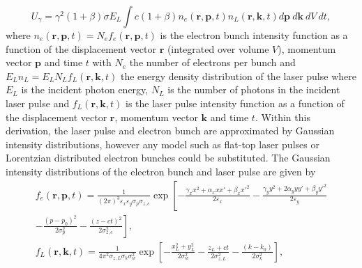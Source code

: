\documentclass[../main.tex]{subfiles}
\begin{document}
\begin{equation}
U_{\gamma} = \gamma^{2}\left(1+\beta\right)\sigma E_{L}\int c\left(1+\beta\right) n_{e}\left(\mathbf{r},\mathbf{p},t\right)n_{L}\left(\mathbf{r},\mathbf{k},t\right) d\mathbf{p}~d\mathbf{k}~dV~dt,
\label{eq:total_interaction_energy}
\end{equation}
where $n_{e}\left(\mathbf{r},\mathbf{p},t\right) = N_{e}f_{e}\left(\mathbf{r},\mathbf{p},t\right)$ is the  electron bunch intensity function as a function of the displacement vector $\mathbf{r}$ (integrated over volume $V$), momentum vector $\mathbf{p}$ and time $t$ with $N_{e}$ the number of electrons per bunch and $E_{L}n_{L} = E_{L}N_{L}f_{L}\left(\mathbf{r},\mathbf{k},t\right)$ the energy density distribution of the laser pulse where $E_{L}$ is the incident photon energy, $N_{L}$ is the number of photons in the incident laser pulse and $f_{L}\left(\mathbf{r},\mathbf{k},t\right)$ is the laser pulse intensity function as a function of the displacement vector $\mathbf{r}$, momentum vector $\mathbf{k}$ and time $t$. Within this derivation, the laser pulse and electron bunch are approximated by Gaussian intensity distributions, however any model such as flat-top laser pulses or Lorentzian distributed electron bunches could be substituted. The Gaussian intensity distributions of the electron bunch and laser pulse are given by \cite{sun2011theoretical}
\begin{gather} %
f_{e}\left(\mathbf{r},\mathbf{p},t\right) = \frac{1}{\left(2\pi\right)^{3}\varepsilon_{x}\varepsilon_{y}\sigma_{p}\sigma_{z,e}}\exp\left[-\frac{\gamma_{x}x^{2}+\alpha_{x}xx'+\beta_{x}x'^{2}}{2\varepsilon_{x}}-\frac{\gamma_{y}y^{2}+2\alpha_{y}yy'+\beta_{y}y'^{2}}{2\varepsilon_{y}}\right.\\\left.-\frac{\left(p-p_{0}\right)^{2}}{2\sigma_{p}^{2}}-\frac{\left(z-ct\right)^{2}}{2\sigma_{z,e}^{2}}\right], \nonumber
\label{eq:electron_gaussian_intensity_distribution} \\
f_{L}\left(\mathbf{r},\mathbf{k},t\right) = \frac{1}{4\pi^{2}\sigma_{z,L}\sigma_{k}\sigma_{w}^{2}}\exp\left[-\frac{x_{L}^{2}+y_{L}^{2}}{2\sigma_{w}^{2}}-\frac{z_{L}+ct}{2\sigma_{z,L}^{2}}-\frac{\left(k-k_{0}\right)}{2\sigma_{k}^{2}}\right],
\label{eq:laser_gaussian_intensity_distribution}
\end{gather}
\end{document}
